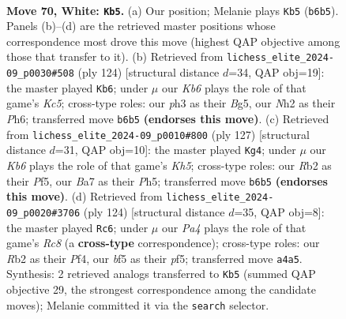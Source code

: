 \documentclass[11pt]{article}
\begin{document}
\clearpage

\begin{figure}[p]\centering
\begin{subfigure}{0.46\textwidth}\centering
\resizebox{\linewidth}{!}{%
\newchessgame
\chessboard[
  setfen={8/B3k3/1K6/5b2/P7/1P3Brp/1R5N/8 w - - 18 70},
  showmover=false,
  pgfstyle=straightmove, color=movearrow, markmove={b6-b5}
]}
\caption{}
\end{subfigure}\hfill
\begin{subfigure}{0.46\textwidth}\centering
\resizebox{\linewidth}{!}{%
\newchessgame
\chessboard[
  setfen={8/7p/7P/P1K1R1B1/4b3/2P2k2/8/6r1 w - - 11 63},
  showmover=false,
  pgfstyle=straightmove, color=movearrow, markmove={c5-b6}
]}
\caption{}
\end{subfigure}
\\[4pt]
\begin{subfigure}{0.46\textwidth}\centering
\resizebox{\linewidth}{!}{%
\newchessgame
\chessboard[
  setfen={8/8/8/p4p1p/Pb5k/1r6/1PR5/6K1 b - - 9 64},
  showmover=false,
  pgfstyle=straightmove, color=movearrow, markmove={h4-g4}
]}
\caption{}
\end{subfigure}\hfill
\begin{subfigure}{0.46\textwidth}\centering
\resizebox{\linewidth}{!}{%
\newchessgame
\chessboard[
  setfen={2RB4/4P1k1/4r3/5p2/4pP1p/8/4K3/8 w - - 1 63},
  showmover=false,
  pgfstyle=straightmove, color=movearrow, markmove={c8-c6}
]}
\caption{}
\end{subfigure}
\caption{\textbf{Move 70, White: \texttt{Kb5}.} (a) Our position; Melanie plays \texttt{Kb5} (\texttt{b6b5}). Panels (b)--(d) are the retrieved master positions whose correspondence most drove this move (highest QAP objective among those that transfer to it). (b) Retrieved from \texttt{lichess\_elite\_2024-09\_p0030\#508} (ply 124) [structural distance $d$=34, QAP obj=19]: the master played \texttt{Kb6}; under $\mu$ our \emph{Kb6} plays the role of that game's \emph{Kc5}; cross-type roles: our \emph{p}h3 as their \emph{B}g5, our \emph{N}h2 as their \emph{P}h6; transferred move \texttt{b6b5} \textbf{(endorses this move)}. (c) Retrieved from \texttt{lichess\_elite\_2024-09\_p0010\#800} (ply 127) [structural distance $d$=31, QAP obj=10]: the master played \texttt{Kg4}; under $\mu$ our \emph{Kb6} plays the role of that game's \emph{Kh5}; cross-type roles: our \emph{R}b2 as their \emph{P}f5, our \emph{B}a7 as their \emph{P}h5; transferred move \texttt{b6b5} \textbf{(endorses this move)}. (d) Retrieved from \texttt{lichess\_elite\_2024-09\_p0020\#3706} (ply 124) [structural distance $d$=35, QAP obj=8]: the master played \texttt{Rc6}; under $\mu$ our \emph{Pa4} plays the role of that game's \emph{Rc8} (a \textbf{cross-type} correspondence); cross-type roles: our \emph{R}b2 as their \emph{P}f4, our \emph{b}f5 as their \emph{p}f5; transferred move \texttt{a4a5}. Synthesis: 2 retrieved analogs transferred to \texttt{Kb5} (summed QAP objective 29, the strongest correspondence among the candidate moves); Melanie committed it via the \texttt{search} selector.}
\label{fig:thought-m138}
\end{figure}
\end{document}
